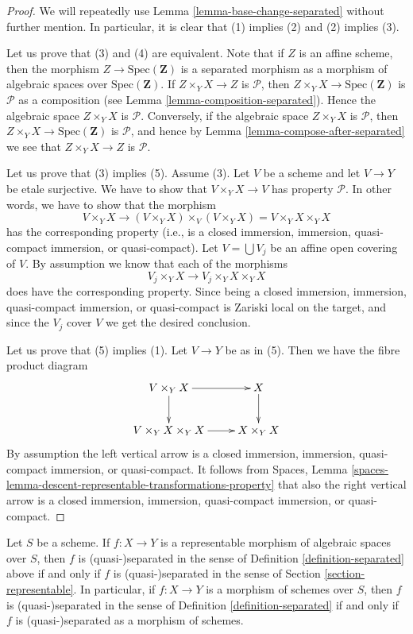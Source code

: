 \begin{proof}
We will repeatedly use
Lemma \ref{lemma-base-change-separated}
without further mention. In particular, it is clear that
(1) implies (2) and (2) implies (3).

\medskip\noindent
Let us prove that (3) and (4) are equivalent. Note that if $Z$ is an affine
scheme, then the morphism $Z \to \text{Spec}(\mathbf{Z})$ is a separated
morphism as a morphism of algebraic spaces over $\text{Spec}(\mathbf{Z})$.
If $Z \times_Y X \to Z$ is $\mathcal{P}$, then
$Z \times_Y X \to \text{Spec}(\mathbf{Z})$ is $\mathcal{P}$
as a composition (see
Lemma \ref{lemma-composition-separated}). Hence the algebraic
space $Z \times_Y X$ is $\mathcal{P}$. Conversely, if the algebraic
space $Z \times_Y X$ is $\mathcal{P}$, then
$Z \times_Y X \to \text{Spec}(\mathbf{Z})$ is $\mathcal{P}$, and
hence by
Lemma \ref{lemma-compose-after-separated}
we see that $Z \times_Y X \to Z$ is $\mathcal{P}$.

\medskip\noindent
Let us prove that (3) implies (5). Assume (3). Let $V$ be a scheme
and let $V \to Y$ be etale surjective. We have to show that
$V \times_Y X \to V$ has property $\mathcal{P}$. In other words,
we have to show that the morphism
$$
V \times_Y X \longrightarrow
(V \times_Y X) \times_V (V \times_Y X) = V \times_Y X \times_Y X
$$
has the corresponding property (i.e., is a closed immersion, immersion,
quasi-compact immersion, or quasi-compact). Let $V = \bigcup V_j$ be an
affine open covering of $V$. By assumption we know that each of the morphisms
$$
V_j \times_Y X \longrightarrow V_j \times_Y X \times_Y X
$$
does have the corresponding property. Since being a closed immersion,
immersion, quasi-compact immersion, or quasi-compact is Zariski local
on the target, and since the $V_j$ cover $V$ we get the desired conclusion.

\medskip\noindent
Let us prove that (5) implies (1). Let $V \to Y$ be as in (5).
Then we have the fibre product diagram
$$
\xymatrix{
V \times_Y X \ar[r] \ar[d] &
X \ar[d] \\
V \times_Y X \times_Y X \ar[r] &
X \times_Y X
}
$$
By assumption the left vertical arrow is a closed immersion,
immersion, quasi-compact immersion, or quasi-compact. It follows from
Spaces, Lemma \ref{spaces-lemma-descent-representable-transformations-property}
that also the right vertical arrow is a closed immersion,
immersion, quasi-compact immersion, or quasi-compact.
\end{proof}

\begin{lemma}
\label{lemma-match-separated}
Let $S$ be a scheme.
If $f : X \to Y$ is a representable morphism of algebraic spaces over $S$,
then $f$ is (quasi-)separated in the sense of
Definition \ref{definition-separated}
above if and only if $f$ is (quasi-)separated in the sense of
Section \ref{section-representable}. In particular,
if $f : X \to Y$ is a morphism of schemes over $S$, then
$f$ is (quasi-)separated in the sense of
Definition \ref{definition-separated}
if and only if $f$ is (quasi-)separated as a morphism of schemes.
\end{lemma}

